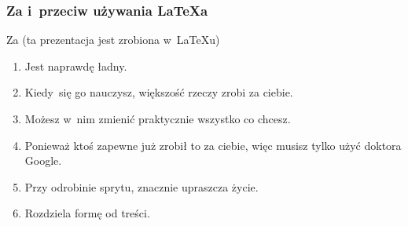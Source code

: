 \documentclass[10pt,t]{beamer}
\begin{document}
\begin{frame}
  \frametitle{Za i~przeciw używania \LaTeX a}


  Za (ta prezentacja jest zrobiona w~\LaTeX u)
  \begin{enumerate}
    \RaggedRight

  \item Jest naprawdę ładny.

  \item Kiedy~się go nauczysz, większość rzeczy zrobi za ciebie.

  \item Możesz w~nim zmienić praktycznie wszystko co chcesz.

  \item Ponieważ ktoś zapewne już zrobił to za ciebie, więc musisz
    tylko użyć {\color{blue} doktora Google}.

  \item Przy odrobinie sprytu, znacznie upraszcza życie.

  \item Rozdziela formę od treści.

  \end{enumerate}

\end{frame}
\end{document}

